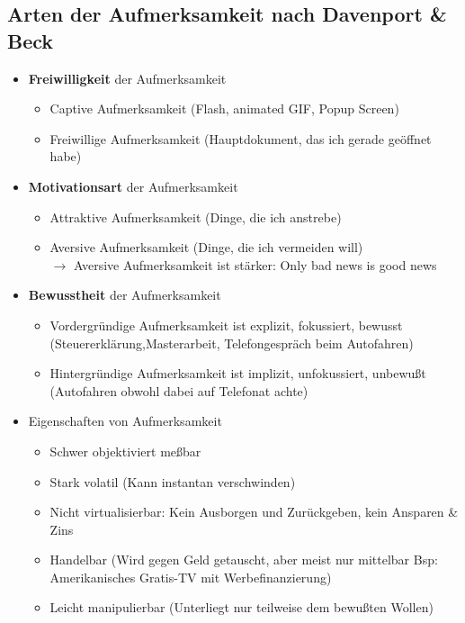 \documentclass{article} %
\begin{document}
	\subsection{Arten der Aufmerksamkeit nach Davenport \& Beck}
	\begin{itemize}
		\item \textbf{Freiwilligkeit} der Aufmerksamkeit
		\begin{itemize}
			\item Captive Aufmerksamkeit (Flash, animated GIF, Popup Screen)
			\item Freiwillige Aufmerksamkeit (Hauptdokument, das ich gerade geöffnet habe)
		\end{itemize}
		\item \textbf{Motivationsart} der Aufmerksamkeit
		\begin{itemize}
			\item Attraktive Aufmerksamkeit (Dinge, die ich anstrebe)
			\item Aversive Aufmerksamkeit (Dinge, die ich vermeiden will)\\
	$\rightarrow$ Aversive Aufmerksamkeit ist stärker: Only bad news is good news		
		\end{itemize}
		\item \textbf{Bewusstheit} der Aufmerksamkeit
		\begin{itemize}
			\item Vordergründige Aufmerksamkeit ist explizit, fokussiert, bewusst (Steuererklärung,Masterarbeit, Telefongespräch beim Autofahren)
			\item Hintergründige Aufmerksamkeit ist implizit, unfokussiert, unbewußt (Autofahren obwohl dabei auf Telefonat achte)
		\end{itemize}
		\item Eigenschaften von Aufmerksamkeit
		\begin{itemize}
			\item Schwer objektiviert meßbar
			\item Stark volatil (Kann instantan verschwinden)
			\item Nicht virtualisierbar: Kein Ausborgen und Zurückgeben, kein Ansparen \& Zins
			\item Handelbar (Wird gegen Geld getauscht, aber meist nur mittelbar Bsp: Amerikanisches Gratis-TV mit Werbefinanzierung)
			\item Leicht manipulierbar (Unterliegt nur teilweise dem bewußten Wollen)
		\end{itemize}
	\end{itemize}
\end{document}
